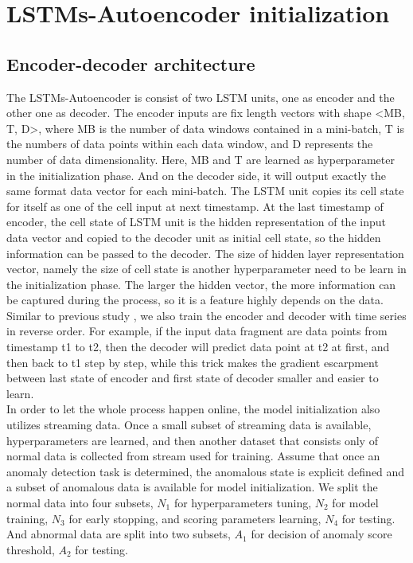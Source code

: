 \section{LSTMs-Autoencoder initialization}
\label{sec:initialization}

\subsection{Encoder-decoder architecture}
\label{sec:Encoder-decoder architecture}

The LSTMs-Autoencoder is consist of two LSTM units, one as encoder and the other one as decoder. The encoder inputs are fix length vectors with shape <MB, T, D>, where MB is the number of data windows contained in a mini-batch, T is the numbers of data points within each data window, and D represents the number of data dimensionality. Here, MB and T are learned as hyperparameter in the initialization phase. And on the decoder side, it will output exactly the same format data vector for each mini-batch. The LSTM unit copies its cell state for itself as one of the cell input at next timestamp. At the last timestamp of encoder, the cell state of LSTM unit is the hidden representation of the input data vector and copied to the decoder unit as initial cell state, so the hidden information can be passed to the decoder. The size of hidden layer representation vector, namely the size of cell state is another hyperparameter need to be learn in the initialization phase. The larger the hidden vector, the more information can be captured during the process, so it is a feature highly depends on the data. Similar to previous study \cite{seq2seq}, we also train the encoder and decoder with time series in reverse order. For example, if the input data fragment are data points from timestamp t1 to t2, then the decoder will predict data point at t2 at first, and then back to t1 step by step, while this trick makes the gradient escarpment between last state of encoder and first state of decoder smaller and easier to learn. \\

In order to let the whole process happen online, the model initialization also utilizes streaming data. Once a small subset of streaming data is available, hyperparameters are learned, and then another dataset that consists only of normal data is collected from stream used for training. Assume that once an anomaly detection task is determined, the anomalous state is explicit defined and a subset of anomalous data is available for model initialization. We split the normal data into four subsets, $N_1$ for hyperparameters tuning, $N_2$ for model training, $N_3$ for early stopping, and scoring parameters learning, $N_4$ for testing. And abnormal data are split into two subsets, $A_1$ for decision of anomaly score threshold, $A_2$ for testing.

